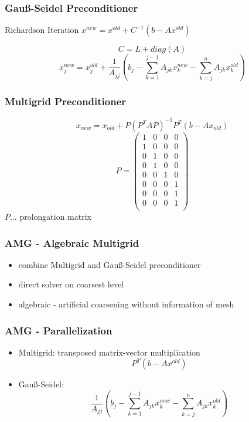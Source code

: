 \documentclass{beamer}
\begin{document}
\begin{frame}
\frametitle{Gau\ss-Seidel Preconditioner}
\begin{block}{Richardson Iteration}
$x^{new} = x^{old} + C^{-1} (b - Ax^{old})$
\end{block}
$$C = L + diag(A)$$
$$x_j^{new} = x_j^{old} + \frac{1}{A_{jj}} \left(b_{j} - \sum_{k=1}^{j-1} A_{jk}
x_k^{new} - \sum_{k=j}^{n} A_{jk} x_k^{old}\right)$$
\end{frame}

\begin{frame}
\frametitle{Multigrid Preconditioner}
$$x_{new} = x_{old} + P (P^{T} A P)^{-1} P^{T} (b - A x_{old})$$
$$P =
\begin{pmatrix}
  1 & 0 & 0 & 0 \\
  1 & 0 & 0 & 0 \\
  0 & 1 & 0 & 0 \\
  0 & 1 & 0 & 0 \\
  0 & 0 & 1 & 0 \\
  0 & 0 & 0 & 1 \\
  0 & 0 & 0 & 1 \\
  0 & 0 & 0 & 1 \\
\end{pmatrix}
$$
$P \dots$ prolongation matrix
\end{frame}

\begin{frame}
\frametitle{AMG - Algebraic Multigrid}
\begin{itemize}
  \item combine Multigrid and Gau\ss-Seidel preconditioner
  \item direct solver on coarsest level
  \item algebraic - artificial coarsening without information of mesh
\end{itemize}
\end{frame}

\begin{frame}
\frametitle{AMG - Parallelization}
\begin{itemize}
  \item Multigrid: transposed matrix-vector multiplication
    $$P^{T} (b-Ax^{old})$$
  \item Gau\ss-Seidel: \\ $$\frac{1}{A_{jj}} \left(b_{j} - \sum_{k=1}^{j-1} A_{jk}
x_k^{new} - \sum_{k=j}^{n} A_{jk} x_k^{old}\right)$$
\end{itemize}
\end{frame}
\end{document}

